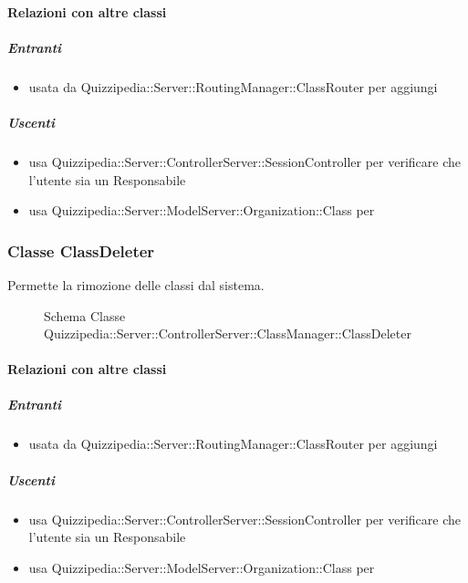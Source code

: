\paragraph{Relazioni con altre classi}
\subparagraph{Entranti}
\begin{itemize}
\item usata da Quizzipedia::Server::RoutingManager::ClassRouter per aggiungi
\end{itemize}
\subparagraph{Uscenti}
\begin{itemize}
\item usa Quizzipedia::Server::ControllerServer::SessionController per verificare che l'utente sia un Responsabile
\item usa Quizzipedia::Server::ModelServer::Organization::Class per 
\end{itemize}
\subsubsection{Classe ClassDeleter}
Permette la rimozione delle classi dal sistema.
\begin{figure}[H]
\centering
\noindent{}
\caption[Schema Classe ClassDeleter]{Schema Classe Quizzipedia::Server::ControllerServer::ClassManager::ClassDeleter}
\end{figure}
\paragraph{Relazioni con altre classi}
\subparagraph{Entranti}
\begin{itemize}
\item usata da Quizzipedia::Server::RoutingManager::ClassRouter per aggiungi
\end{itemize}
\subparagraph{Uscenti}
\begin{itemize}
\item usa Quizzipedia::Server::ControllerServer::SessionController per verificare che l'utente sia un Responsabile
\item usa Quizzipedia::Server::ModelServer::Organization::Class per 
\end{itemize}
